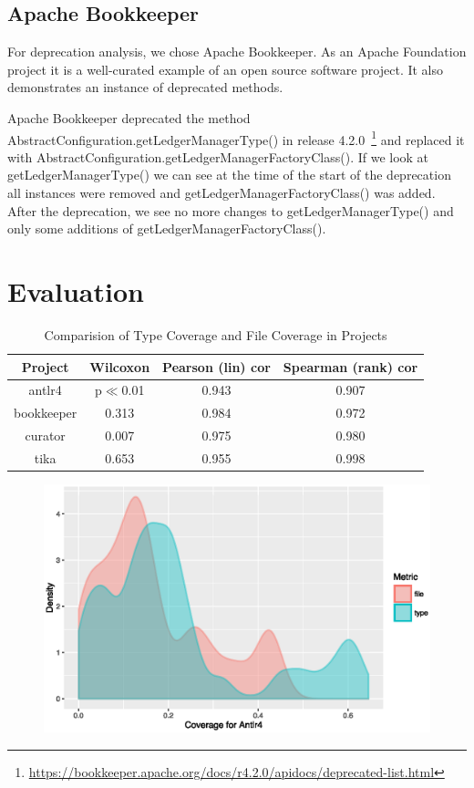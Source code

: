 \documentclass[conference]{IEEEtran}
\begin{document}
\subsection{Apache Bookkeeper}

For deprecation analysis, we chose Apache Bookkeeper. As an Apache Foundation project it is a well-curated example of an open source software project. It also demonstrates an instance of deprecated methods. 

Apache Bookkeeper deprecated the method AbstractConfiguration.getLedgerManagerType() in release 4.2.0~\footnote{\url{https://bookkeeper.apache.org/docs/r4.2.0/apidocs/deprecated-list.html}} and replaced it with AbstractConfiguration.getLedgerManagerFactoryClass(). If we look at getLedgerManagerType() we can see at the time of the start of the deprecation all instances were removed and getLedgerManagerFactoryClass() was added. After the deprecation, we see no more changes to getLedgerManagerType() and only some additions of getLedgerManagerFactoryClass().

\section{Evaluation}

\begin{table}[!t]
\renewcommand{\arraystretch}{1.3}
\caption{Comparision of Type Coverage and File Coverage in Projects}
\label{tab:summary}
\centering
\begin{tabular}{c|ccc}
\hline
\bfseries Project & \bfseries Wilcoxon & \bfseries Pearson (lin) cor & \bfseries Spearman (rank) cor \\
\hline
antlr4 & p$\ll$0.01 & 0.943 & 0.907\\
bookkeeper & 0.313 & 0.984 & 0.972\\
curator & 0.007 & 0.975 & 0.980\\
tika & 0.653 & 0.955 & 0.998\\
\hline
\end{tabular}
\end{table}

\begin{figure}[!h]
\centering
\includegraphics[width=\columnwidth]{antlr-density}
\caption{}
\end{figure}
\end{document}
